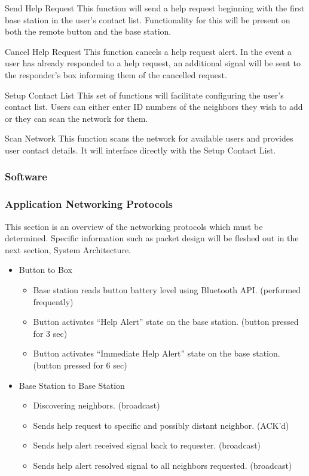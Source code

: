 \documentclass[journal]{IEEEtran}
\begin{document}
\begin{LaTeXdescription}
\item[Send Help Request] This function will send a help request beginning with the first base station in the user’s contact list.  Functionality for this will be present on both the remote button and the base station.
\item[Cancel Help Request] This function cancels a help request alert.  In the event a user has already responded to a help request, an additional signal will be sent to the responder’s box informing them of the cancelled request.
\item[Setup Contact List] This set of functions will facilitate configuring the user’s contact list.  Users can either enter ID numbers of the neighbors they wish to add or they can scan the network for them.
\item[Scan Network] This function scans the network for available users and provides user contact details.  It will interface directly with the Setup Contact List.
\end{LaTeXdescription}

\subsubsection{Software}

\subsubsection{Application Networking Protocols}

This section is an overview of the networking protocols which must be determined.  Specific information such as packet design will be fleshed out in the next section, System Architecture.

\begin{itemize}
  \item Button to Box
    \begin{itemize}
      \item Base station reads button battery level using Bluetooth API. (performed frequently)
      \item Button activates “Help Alert” state on the base station. (button pressed for 3 sec)
      \item Button activates “Immediate Help Alert” state on the base station. (button pressed for 6 sec)
    \end{itemize}
  \item Base Station to Base Station
    \begin{itemize}
      \item Discovering neighbors. (broadcast)
      \item Sends help request to specific and possibly distant neighbor. (ACK’d)
      \item Sends help alert received signal back to requester. (broadcast)
      \item Sends help alert resolved signal to all neighbors requested. (broadcast)
    \end{itemize}
\end{itemize}
\end{document}
